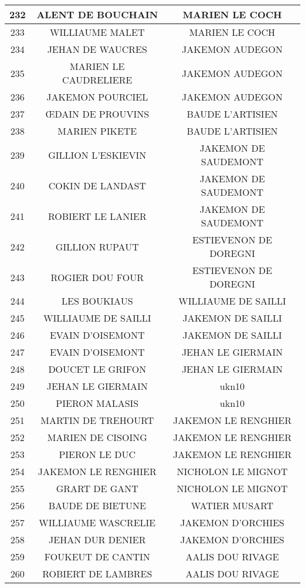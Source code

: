 \begin{center}
\begin{longtable}{|c|c|c|}
\hline	232	&	ALENT DE BOUCHAIN	&	MARIEN LE COCH	\\
\hline	233	&	WILLIAUME MALET	&	MARIEN LE COCH	\\
\hline	234	&	JEHAN DE WAUCRES	&	JAKEMON AUDEGON	\\
\hline	235	&	MARIEN LE CAUDRELIERE	&	JAKEMON AUDEGON	\\
\hline	236	&	JAKEMON POURCIEL	&	JAKEMON AUDEGON	\\
\hline	237	&	ŒDAIN DE PROUVINS	&	BAUDE L'ARTISIEN	\\
\hline	238	&	MARIEN PIKETE	&	BAUDE L'ARTISIEN	\\
\hline	239	&	GILLION L'ESKIEVIN	&	JAKEMON DE SAUDEMONT	\\
\hline	240	&	COKIN DE LANDAST	&	JAKEMON DE SAUDEMONT	\\
\hline	241	&	ROBIERT LE LANIER	&	JAKEMON DE SAUDEMONT	\\
\hline	242	&	GILLION RUPAUT	&	ESTIEVENON DE DOREGNI	\\
\hline	243	&	ROGIER DOU FOUR	&	ESTIEVENON DE DOREGNI	\\
\hline	244	&	LES BOUKIAUS	&	WILLIAUME DE SAILLI	\\
\hline	245	&	WILLIAUME DE SAILLI	&	JAKEMON DE SAILLI	\\
\hline	246	&	EVAIN D'OISEMONT	&	JAKEMON DE SAILLI	\\
\hline	247	&	EVAIN D'OISEMONT	&	JEHAN LE GIERMAIN	\\
\hline	248	&	DOUCET LE GRIFON	&	JEHAN LE GIERMAIN	\\
\hline	249	&	JEHAN LE GIERMAIN	&	ukn10	\\
\hline	250	&	PIERON MALASIS	&	ukn10	\\
\hline	251	&	MARTIN DE TREHOURT	&	JAKEMON LE RENGHIER	\\
\hline	252	&	MARIEN DE CISOING	&	JAKEMON LE RENGHIER	\\
\hline	253	&	PIERON LE DUC	&	JAKEMON LE RENGHIER	\\
\hline	254	&	JAKEMON LE RENGHIER	&	NICHOLON LE MIGNOT	\\
\hline	255	&	GRART DE GANT	&	NICHOLON LE MIGNOT	\\
\hline	256	&	BAUDE DE BIETUNE	&	WATIER MUSART	\\
\hline	257	&	WILLIAUME WASCRELIE	&	JAKEMON D'ORCHIES	\\
\hline	258	&	JEHAN DUR DENIER	&	JAKEMON D'ORCHIES	\\
\hline	259	&	FOUKEUT DE CANTIN	&	AALIS DOU RIVAGE	\\
\hline	260	&	ROBIERT DE LAMBRES	&	AALIS DOU RIVAGE	\\

\end{longtable}
\end{center}
